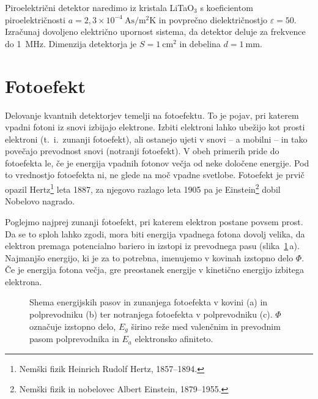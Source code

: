 \begin{definition}
Piroelektrični detektor naredimo iz kristala LiTaO$_3$ 
s koeficientom piroelektričnosti
$a = 2,3 \times 10^{-4}~\si{\ampere \second /\metre^2 \kelvin}$ in povprečno 
dielektričnostjo $\varepsilon = 50$. Izračunaj dovoljeno električno upornost sistema, 
da detektor deluje za frekvence do 1~MHz. 
Dimenzija detektorja je $S = 1~\si{\centi\metre^2}$ in debelina $d = 1~\si{\milli\metre}$.
\end{definition}

\section{Fotoefekt}
Delovanje kvantnih detektorjev temelji na fotoefektu. 
To je pojav, pri katerem vpadni
fotoni iz snovi izbijajo elektrone. Izbiti elektroni lahko ubežijo kot prosti elektroni
(t.\ i.\ zunanji fotoefekt),
ali ostanejo ujeti v snovi -- a mobilni -- in tako povečajo 
prevodnost snovi (notranji fotoefekt). 
V obeh primerih pride do fotoefekta le, 
če je energija vpadnih fotonov večja od neke določene energije.
Pod to vrednostjo fotoefekta ni, ne glede na moč vpadne svetlobe.
Fotoefekt je prvič opazil Hertz\footnote{Nemški fizik Heinrich Rudolf Hertz, 1857--1894.} 
leta 1887, za njegovo razlago leta
1905 pa je Einstein\footnote{Nemški fizik in nobelovec Albert Einstein, 1879--1955.} 
dobil Nobelovo nagrado. 

Poglejmo najprej zunanji fotoefekt, pri katerem elektron postane povsem prost. 
Da se to sploh lahko zgodi, mora biti energija vpadnega fotona dovolj velika, da 
elektron premaga potencialno bariero in izstopi iz prevodnega pasu (slika~\ref{fig:Nivoji}\,a). 
Najmanjšo energijo, ki je za to potrebna, imenujemo v kovinah izstopno delo $\Phi$. 
Če je energija fotona večja, gre preostanek energije v kinetično energijo izbitega
elektrona.

\begin{figure}[h]
\centering
\def\svgwidth{140truemm} 

\caption{Shema energijskih pasov in zunanjega fotoefekta v kovini (a) in polprevodniku (b) ter
notranjega fotoefekta v polprevodniku (c). $\Phi$ označuje izstopno delo, $E_g$ širino reže 
med valenčnim in prevodnim pasom polprevodnika in $E_a$ elektronsko afiniteto. }
\label{fig:Nivoji}
\end{figure}

